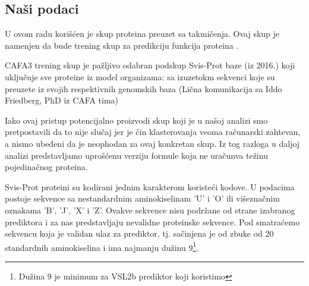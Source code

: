 %

\subsection{Naši podaci}

U ovom radu korišćen je skup proteina preuzet sa  takmičenja.
Ovaj skup je namenjen da bude trening skup za predikciju funkcija proteina \parencite{CAFA}. 

CAFA3 trening skup je pažljivo odabran podskup Svis-Prot baze (iz 2016.) koji
uključuje sve proteine iz model organizama:  sa izuzetokm sekvenci  koje su preuzete iz svojih respektivnih genomskih baza (Lična
komunikacija sa Iddo Friedberg, PhD iz CAFA tima)

Iako ovaj pristup potencijalno proizvodi skup koji je  u našoj analizi smo pretpostavili da to nije slučaj jer je čin
klasterovanja veoma računarski zahtevan, a nismo ubeđeni da je neophodan za
ovaj konkretan skup. Iz tog razloga u daljoj analizi predstavljamo uprošćenu
verziju formule koja ne uračunva težinu pojedinačnog proteina.

Svis-Prot proteini su kodirani jednim karakterom koristeći 
kodove.  U podacima postoje sekvence sa nestandardnim aminokiselinam 'U' i 'O'
ili višeznačnim oznakama 'B', 'J', 'X' i 'Z'.  Ovakve sekvence nisu podržane od
strane izabranog prediktora i za nas predstavljaju nevalidne proteinske sekvence. Pod
 smatraćemo sekvencu koja je validan
ulaz za prediktor, tj. sačinjena je od  zbuke od 20 standardnih aminokiselina i
ima najmanju dužinu 9\footnote{ Dužina 9 je minimum za VSL2b prediktor koji
koristimo}.

